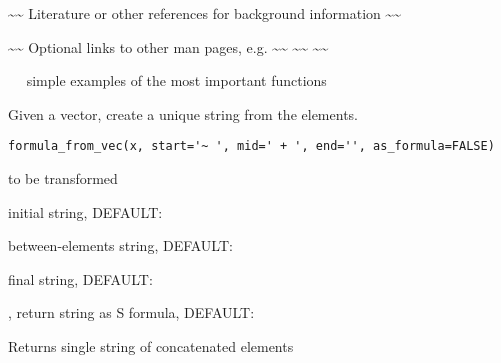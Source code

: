 \documentclass[letterpaper]{book}
\begin{document}
%
\begin{References}\relax
\textasciitilde{}\textasciitilde{} Literature or other references for background information \textasciitilde{}\textasciitilde{}
\end{References}
%
\begin{SeeAlso}\relax
\textasciitilde{}\textasciitilde{} Optional links to other man pages, e.g. \textasciitilde{}\textasciitilde{}
\textasciitilde{}\textasciitilde{}  \textasciitilde{}\textasciitilde{}
\end{SeeAlso}
%
\begin{Examples}
\begin{ExampleCode}
~~ simple examples of the most important functions ~~
\end{ExampleCode}
\end{Examples}
%
\begin{Description}\relax
Given a vector, create a unique string from the elements.
\end{Description}
%
\begin{Usage}
\begin{verbatim}
formula_from_vec(x, start='~ ', mid=' + ', end='', as_formula=FALSE)
\end{verbatim}
\end{Usage}
%
\begin{Arguments}
\begin{ldescription}
\item[\code{x}] 
 to be transformed

\item[\code{start}] 
initial string, DEFAULT: 

\item[\code{mid}] 
between-elements string, DEFAULT: 

\item[\code{end}] 
final string, DEFAULT: 

\item[\code{as\_formula}] 
, return string as S formula, DEFAULT: 

\end{ldescription}
\end{Arguments}
%
\begin{Value}
Returns single string of concatenated elements
\end{Value}
\end{document}
